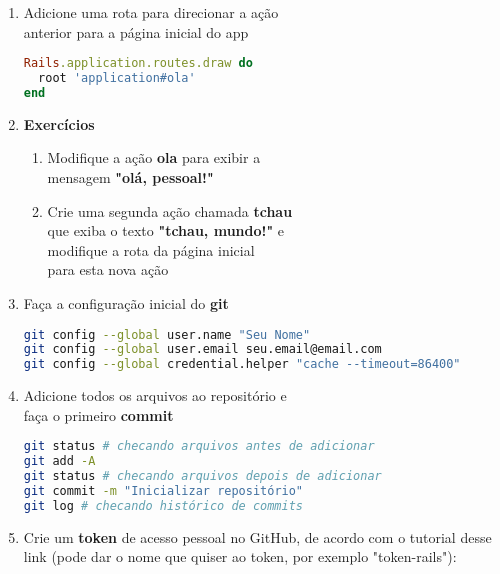 \documentclass[a4paper,12pt]{article}
\begin{document}
\begin{enumerate}
  \pagebreak

  \item Adicione uma rota para direcionar a ação \\
        anterior para a página inicial do app

    \begin{lstlisting}[language=Ruby, title=config/routes.rb]
Rails.application.routes.draw do
  root 'application#ola'
end
    \end{lstlisting}

  \item \textbf{Exercícios}

    \begin{enumerate}
      \item Modifique a ação \textbf{ola} para exibir a \\
            mensagem \textbf{"olá, pessoal!"}
      \item Crie uma segunda ação chamada \textbf{tchau} \\
            que exiba o texto \textbf{"tchau, mundo!"} e \\
            modifique a rota da página inicial \\
            para esta nova ação
    \end{enumerate}

  \item Faça a configuração inicial do \textbf{git}

    \begin{lstlisting}[language=Bash, basicstyle=\fontsize{8.6}{12}\selectfont\ttfamily]
git config --global user.name "Seu Nome"
git config --global user.email seu.email@email.com
git config --global credential.helper "cache --timeout=86400"
    \end{lstlisting}

  \item Adicione todos os arquivos ao repositório e \\
        faça o primeiro \textbf{commit}

    \begin{lstlisting}[language=Bash, commentstyle=\color{gray}]
git status # checando arquivos antes de adicionar
git add -A
git status # checando arquivos depois de adicionar
git commit -m "Inicializar repositório"
git log # checando histórico de commits
    \end{lstlisting}

  \item Crie um \textbf{token} de acesso pessoal no GitHub, de acordo com o tutorial desse link (pode dar o nome que quiser ao token, por exemplo "token-rails"):


\end{enumerate}
\end{document}
